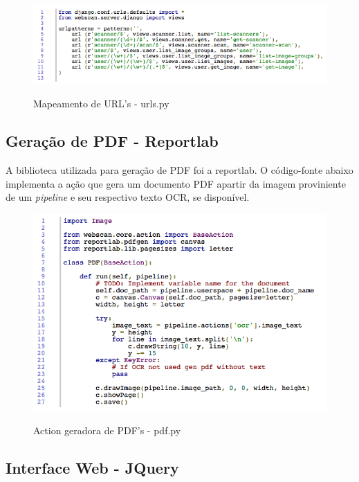 \begin{figure}[ht]
\begin{center}
\scalebox{0.65} {
    \includegraphics{imagens/urls.png}}
\end{center}
  \caption{Mapeamento de URL's - urls.py}
  \label{fig:urls}
\end{figure}

\subsection{Geração de PDF - Reportlab}

A biblioteca utilizada para geração de PDF foi a reportlab.
O código-fonte abaixo implementa a ação que gera um documento PDF apartir da 
imagem proviniente de um {\it pipeline} e seu respectivo texto OCR, se 
disponível.

\begin{figure}[ht]
\begin{center}
\scalebox{0.65} {
    \includegraphics{imagens/pdf.png}}
\end{center}
  \caption{Action geradora de PDF's - pdf.py}
  \label{fig:urls}
\end{figure}


\subsection{Interface Web - JQuery}

